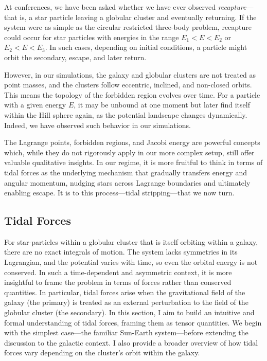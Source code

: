         At conferences, we have been asked whether we have ever observed \textit{recapture}—that is, a star particle leaving a globular cluster and eventually returning. If the system were as simple as the circular restricted three-body problem, recapture could occur for star particles with energies in the range \( E_1 < E < E_2 \) or \( E_2 < E < E_3 \). In such cases, depending on initial conditions, a particle might orbit the secondary, escape, and later return.

        However, in our simulations, the galaxy and globular clusters are not treated as point masses, and the clusters follow eccentric, inclined, and non-closed orbits. This means the topology of the forbidden region evolves over time. For a particle with a given energy \( E \), it may be unbound at one moment but later find itself within the Hill sphere again, as the potential landscape changes dynamically. Indeed, we have observed such behavior in our simulations.

        The Lagrange points, forbidden regions, and Jacobi energy are powerful concepts which, while they do not rigorously apply in our more complex setup, still offer valuable qualitative insights. In our regime, it is more fruitful to think in terms of tidal forces as the underlying mechanism that gradually transfers energy and angular momentum, nudging stars across Lagrange boundaries and ultimately enabling escape. It is to this process—tidal stripping—that we now turn.


    \subsection{Tidal Forces}
        For star-particles within a globular cluster that is itself orbiting within a galaxy, there are no exact integrals of motion. The system lacks symmetries in its Lagrangian, and the potential varies with time, so even the orbital energy is not conserved. In such a time-dependent and asymmetric context, it is more insightful to frame the problem in terms of forces rather than conserved quantities. In particular, tidal forces arise when the gravitational field of the galaxy (the primary) is treated as an external perturbation to the field of the globular cluster (the secondary). In this section, I aim to build an intuitive and formal understanding of tidal forces, framing them as tensor quantities. We begin with the simplest case—the familiar Sun-Earth system—before extending the discussion to the galactic context. I also provide a broader overview of how tidal forces vary depending on the cluster's orbit within the galaxy.

